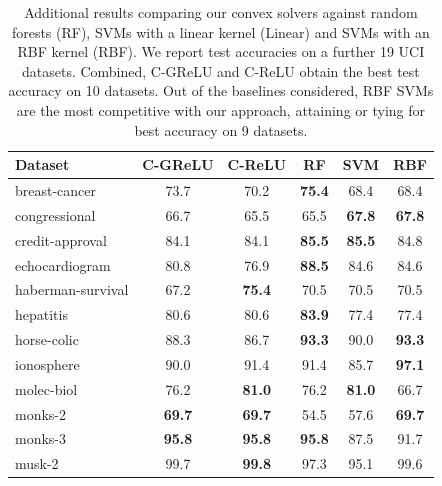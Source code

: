 \begin{table}[t]
	\centering
	\caption{Additional results comparing our convex solvers against random forests (RF), SVMs with a linear kernel (Linear)
		and SVMs with an RBF kernel (RBF).
		We report test accuracies on a further 19 UCI datasets.
		Combined, C-GReLU and C-ReLU obtain the best test accuracy on 10 datasets.
		Out of the baselines considered, RBF SVMs are the most competitive with our approach,
		attaining or tying for best accuracy on 9 datasets.
	}%
	\label{table:binary-uci-accuracies-alt}
	\vspace{0.1in}
	\begin{small}
		\begin{tabular}{lccccc} \toprule
			\textbf{Dataset}  & \textbf{C-GReLU} & \textbf{C-ReLU} & \textbf{RF}   & \textbf{SVM}  & \textbf{RBF}  \\ \midrule
			breast-cancer     & 73.7             & 70.2            & \textbf{75.4} & 68.4          & 68.4          \\
			congressional     & 66.7             & 65.5            & 65.5          & \textbf{67.8} & \textbf{67.8} \\
			credit-approval   & 84.1             & 84.1            & \textbf{85.5} & \textbf{85.5} & 84.8          \\
			echocardiogram    & 80.8             & 76.9            & \textbf{88.5} & 84.6          & 84.6          \\
			haberman-survival & 67.2             & \textbf{75.4}   & 70.5          & 70.5          & 70.5          \\
			hepatitis         & 80.6             & 80.6            & \textbf{83.9} & 77.4          & 77.4          \\
			horse-colic       & 88.3             & 86.7            & \textbf{93.3} & 90.0          & \textbf{93.3} \\
			ionosphere        & 90.0             & 91.4            & 91.4          & 85.7          & \textbf{97.1} \\
			molec-biol        & 76.2             & \textbf{81.0}   & 76.2          & \textbf{81.0} & 66.7          \\
			monks-2           & \textbf{69.7}    & \textbf{69.7}   & 54.5          & 57.6          & \textbf{69.7} \\
			monks-3           & \textbf{95.8}    & \textbf{95.8}   & \textbf{95.8} & 87.5          & 91.7          \\
			musk-2            & 99.7             & \textbf{99.8}   & 97.3          & 95.1          & 99.6          \\

\end{tabular}
\end{small}
\end{table}

